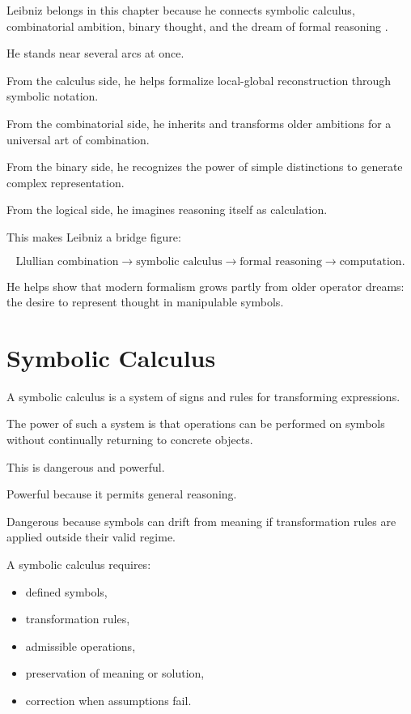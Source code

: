 \documentclass[11pt]{book}
\begin{document}
Leibniz belongs in this chapter because he connects symbolic calculus, combinatorial ambition, binary thought, and the dream of formal reasoning \cite{Leibniz1697Binary,Eco1995SearchPerfectLanguage,Yates1966ArtMemory}.

He stands near several arcs at once.

From the calculus side, he helps formalize local-global reconstruction through symbolic notation.

From the combinatorial side, he inherits and transforms older ambitions for a universal art of combination.

From the binary side, he recognizes the power of simple distinctions to generate complex representation.

From the logical side, he imagines reasoning itself as calculation.

This makes Leibniz a bridge figure:

\[
\text{Llullian combination}
\rightarrow
\text{symbolic calculus}
\rightarrow
\text{formal reasoning}
\rightarrow
\text{computation}.
\]

He helps show that modern formalism grows partly from older operator dreams: the desire to represent thought in manipulable symbols.

\section{Symbolic Calculus}

A symbolic calculus is a system of signs and rules for transforming expressions.

The power of such a system is that operations can be performed on symbols without continually returning to concrete objects.

This is dangerous and powerful.

Powerful because it permits general reasoning.

Dangerous because symbols can drift from meaning if transformation rules are applied outside their valid regime.

A symbolic calculus requires:

\begin{itemize}
    \item defined symbols,
    \item transformation rules,
    \item admissible operations,
    \item preservation of meaning or solution,
    \item correction when assumptions fail.
\end{itemize}
\end{document}
